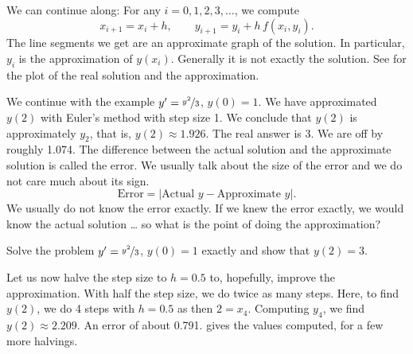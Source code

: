 We can continue along: For any $i=0,1,2,3,\ldots$, we compute
\begin{equation*}
x_{i+1} = x_i + h , \qquad y_{i+1}  = y_i + h\, f(x_i,y_i) .
\end{equation*}
The line segments we get are an
approximate graph of the solution.
In particular, $y_i$ is the approximation of $y(x_i)$.
Generally it is not exactly the solution.
See
 for the plot of the real solution
and the approximation.

\begin{myfig}
\capstart
{}
\caption{Two steps of Euler's method (step size 1) and the exact solution for
the equation $y' = \frac{y^2}{3}$ with initial condition $y(0)=1$.
%
\label{euler-step12-sol:fig}}
\end{myfig}

We continue with the example $y' = \nicefrac{y^2}{3}$, $y(0)=1$.
We have approximated $y(2)$ with Euler's method with step size 1.
We conclude that $y(2)$ is approximately $y_2$, that is,
$y(2) \approx 1.926$.
The real answer is 3.
We are off by roughly 1.074.
The difference between the actual solution and the approximate solution is
called the error.  We usually talk about the size of the error
and we do not care much about its sign.
\begin{equation*}
\text{Error} = \bigl\lvert \text{Actual } y - \text{Approximate } y
\bigr\rvert .
\end{equation*}
We usually do not know the error exactly.
If we knew the error exactly, we would know the actual solution \ldots
so what is the point of doing the approximation?

\begin{exercise}
Solve the problem
$y' = \nicefrac{y^2}{3}$, $y(0)=1$
exactly and show that $y(2) = 3$.
\end{exercise}

Let us now halve the step size to $h=0.5$ to, hopefully, improve the approximation.
With half the step size, we do twice as many steps.
Here, to find $y(2)$, we do 4 steps with $h=0.5$ as then $2 = x_4$.
Computing $y_4$,
we find $y(2) \approx 2.209$.  An error of about 0.791.
 gives the values computed,
for a few more halvings.

